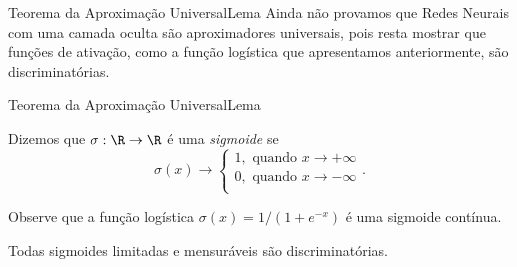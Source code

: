\documentclass[13pt]{beamer}
\begin{document}
\begin{frame}{Teorema da Aproximação Universal}{Lema}
    Ainda não provamos que Redes Neurais com uma camada oculta são aproximadores universais, pois resta mostrar que funções de ativação, como a função logística que apresentamos anteriormente, são discriminatórias.
\end{frame}

\begin{frame}{Teorema da Aproximação Universal}{Lema}
    \begin{defn*}
        Dizemos que \( \sigma : \R \to \R \) é uma \emph{sigmoide} se
        \begin{equation*}
            \sigma ( x ) \to
            \begin{cases}
                1, \text{ quando } x \to + \infty \\
                0, \text{ quando } x \to - \infty \\
            \end{cases}
        .\end{equation*}
    \end{defn*}

    Observe que a função logística \( \sigma ( x ) = 1/( 1 + e^{ -x } ) \) é uma sigmoide contínua.

    \begin{lem*}
        Todas sigmoides limitadas e mensuráveis são discriminatórias.
    \end{lem*}
\end{frame}
\end{document}
